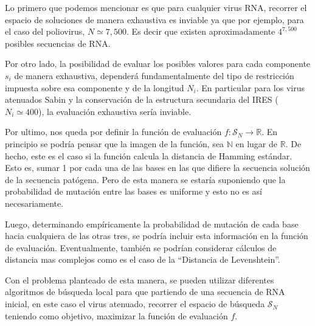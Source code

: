 Lo primero que podemos mencionar es que para cualquier virus \ac{RNA}, recorrer
el espacio de soluciones de manera exhaustiva es inviable ya que por ejemplo,
para el caso del poliovirus, $N \simeq 7,500$. Es decir que existen
aproximadamente $4^{7,500}$ posibles secuencias de \ac{RNA}.

Por otro lado, la posibilidad de evaluar los posibles valores para cada
componente $s_{i}$ de manera exhaustiva, depender\'a fundamentalmente del tipo
de restricci\'on impuesta sobre esa componente y de la longitud $N_{i}$. En
particular para los virus atenuados Sabin y la conservaci\'on de la estructura
secundaria del \ac{IRES} ($N_{i} \simeq 400$), la evaluaci\'on exhaustiva
ser\'ia inviable.

Por ultimo, nos queda por definir la funci\'on de evaluaci\'on $f:
\mathcal{S}_{N} \rightarrow \mathbb{R}$. En principio se podr\'ia pensar que la
imagen de la funci\'on, sea $\mathbb{N}$ en lugar de $\mathbb{R}$. De hecho,
este es el caso si la funci\'on calcula la distancia de Hamming est\'andar.
Esto es, sumar 1 por cada una de las bases en las que difiere la secuencia
soluci\'on de la secuencia pat\'ogena. Pero de esta manera se estar\'ia
suponiendo que la probabilidad de mutaci\'on entre las bases es uniforme y
esto no es as\'i necesariamente. 

Luego, determinando emp\'iricamente la probabilidad de mutaci\'on de cada base
hacia cualquiera de las otras tres, se podr\'ia incluir esta informaci\'on en la
funci\'on de evaluaci\'on. Eventualmente, tambi\'en se podr\'ian considerar
c\'alculos de distancia mas complejos como es el caso de la ``Distancia de
Levenshtein''.

Con el problema planteado de esta manera, se pueden utilizar diferentes
algoritmos de b\'usqueda local para que partiendo de una secuencia de \ac{RNA}
inicial, en este caso el virus atenuado, recorrer el espacio de b\'usqueda
$\mathcal{S}_{N}$ teniendo como objetivo, maximizar la funci\'on de evaluaci\'on
$f$.

